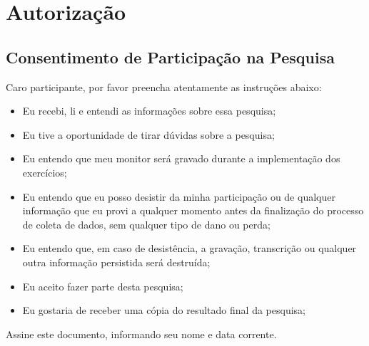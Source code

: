 \chapter{Autorização}
\label{ape:autorizacao}

\section{Consentimento de Participação na Pesquisa}

Caro participante, por favor preencha atentamente as instruções abaixo:

\begin{itemize}
  \item Eu recebi, li e entendi as informações sobre essa pesquisa;
  \item Eu tive a oportunidade de tirar dúvidas sobre a pesquisa;
  \item Eu entendo que meu monitor será gravado durante a implementação dos exercícios;
  \item Eu entendo que eu posso desistir da minha participação ou de
  qualquer informação que eu provi a qualquer momento antes da finalização do processo de
  coleta de dados, sem qualquer tipo de dano ou perda;
  \item Eu entendo que, em caso de desistência, a gravação, transcrição ou
  qualquer outra informação persistida será destruída;
  \item Eu aceito fazer parte desta pesquisa;
  \item Eu gostaria de receber uma cópia do resultado final da pesquisa;
\end{itemize}

Assine este documento, informando seu nome e data corrente.